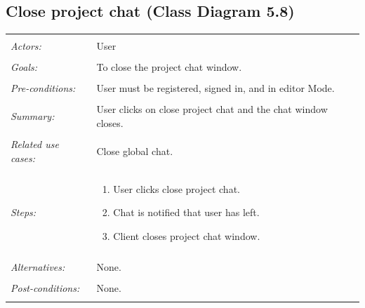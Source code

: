\documentclass[11pt]{report}
\begin{document}
\subsection{Close project chat (Class Diagram 5.8)}
\begin{tabular}{ p{2cm} p{12cm} }
 \hline
 \\
 \textit{Actors:} & User \\ 
 \\
 \textit{Goals:} & To close the project chat window. \\
 \\
 \textit{Pre-conditions:} & User must be registered, signed in, and in editor Mode.  \\
 \\
 \textit{Summary:} & User clicks on close project chat and the chat window closes. \\ 
 \\
 \textit{Related use cases:} & Close global chat. \\ 
 \\
 \textit{Steps:} & \begin{enumerate}
  \item User clicks close project chat.
  \item Chat is notified that user has left.
  \item Client closes project chat window.
 \end{enumerate} \\
 \\
 \textit{Alternatives:} & None. \\
 \\
 \textit{Post-conditions:} & None. \\
 \\
\hline
\end{tabular}
\end{document}
